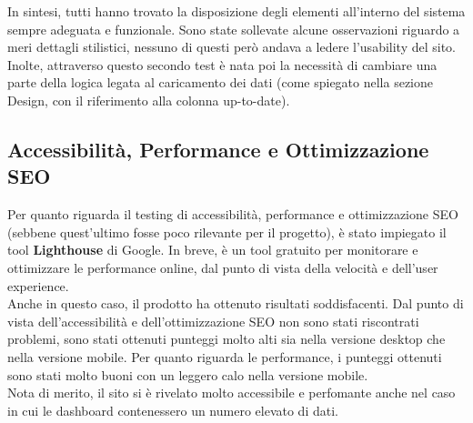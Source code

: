 In sintesi, tutti hanno trovato la disposizione degli elementi all'interno del sistema sempre adeguata e funzionale.
Sono state sollevate alcune osservazioni riguardo a meri dettagli stilistici, nessuno di questi però andava a ledere l'usability del sito. Inolte,
attraverso questo secondo test è nata poi la necessità di cambiare una parte della logica legata al caricamento dei dati (come spiegato nella sezione Design, con il riferimento alla colonna up-to-date).\\

\subsection*{Accessibilità, Performance e Ottimizzazione SEO}
Per quanto riguarda il testing di accessibilità, performance e ottimizzazione SEO (sebbene quest'ultimo fosse poco rilevante per il progetto),
è stato impiegato il tool \textbf{Lighthouse} di Google. In breve, 
è un tool gratuito per monitorare e ottimizzare le performance online, dal punto di vista della velocità e dell'user experience.\\  

Anche in questo caso, il prodotto ha ottenuto risultati soddisfacenti. Dal punto di
vista dell'accessibilità e dell'ottimizzazione SEO non sono stati riscontrati problemi, sono
stati ottenuti punteggi molto alti sia nella versione desktop che nella versione mobile.
Per quanto riguarda le performance, i punteggi ottenuti sono stati molto buoni con 
un leggero calo nella versione mobile.\\

Nota di merito, il sito si è rivelato molto accessibile e perfomante
anche nel caso in cui le dashboard contenessero un numero elevato di dati.\\
